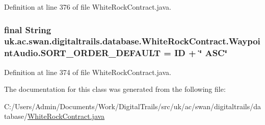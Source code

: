 Definition at line 376 of file White\+Rock\+Contract.\+java.

\hypertarget{classuk_1_1ac_1_1swan_1_1digitaltrails_1_1database_1_1_white_rock_contract_1_1_waypoint_audio_a30370143517411399e60c1421e748229}{
\subsubsection[{S\+O\+R\+T\+\_\+\+O\+R\+D\+E\+R\+\_\+\+D\+E\+F\+A\+U\+L\+T}]{\setlength{\rightskip}{0pt plus 5cm}final String uk.\+ac.\+swan.\+digitaltrails.\+database.\+White\+Rock\+Contract.\+Waypoint\+Audio.\+S\+O\+R\+T\+\_\+\+O\+R\+D\+E\+R\+\_\+\+D\+E\+F\+A\+U\+L\+T = I\+D + \char`\"{} A\+S\+C\char`\"{}\hspace{0.3cm}{\ttfamily [static]}}}\label{classuk_1_1ac_1_1swan_1_1digitaltrails_1_1database_1_1_white_rock_contract_1_1_waypoint_audio_a30370143517411399e60c1421e748229}


Definition at line 374 of file White\+Rock\+Contract.\+java.



The documentation for this class was generated from the following file\+:\begin{DoxyCompactItemize}
\item 
C\+:/\+Users/\+Admin/\+Documents/\+Work/\+Digital\+Trails/src/uk/ac/swan/digitaltrails/database/\hyperlink{_white_rock_contract_8java}{White\+Rock\+Contract.\+java}\end{DoxyCompactItemize}
